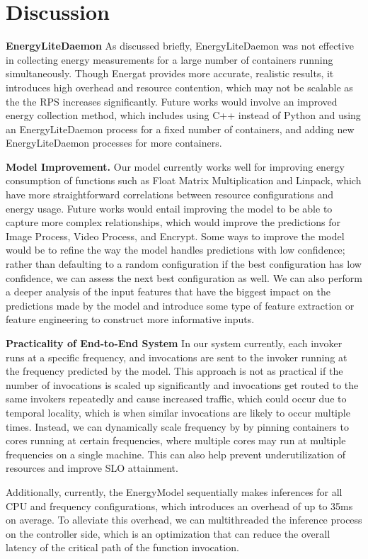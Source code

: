 \documentclass[times, 10pt,twocolumn]{article}
\begin{document}
\section{Discussion}
\textbf{EnergyLiteDaemon} As discussed briefly, EnergyLiteDaemon was not effective in collecting energy measurements for a large number of containers running simultaneously. Though Energat provides more accurate, realistic results, it introduces high overhead and resource contention, which may not be scalable as the the RPS increases significantly. Future works would involve an improved energy collection method, which includes using C++ instead of Python and using an EnergyLiteDaemon process for a fixed number of containers, and adding new EnergyLiteDaemon processes for more containers. 

\textbf{Model Improvement.} Our model currently works well for improving energy consumption of functions such as Float Matrix Multiplication and Linpack, which have more straightforward correlations between resource configurations and energy usage. Future works would entail improving the model to be able to capture more complex relationships, which would improve the predictions for Image Process, Video Process, and Encrypt. Some ways to improve the model would be to refine the way the model handles predictions with low confidence; rather than defaulting to a random configuration if the best configuration has low confidence, we can assess the next best configuration as well. We can also perform a deeper analysis of the input features that have the biggest impact on the predictions made by the model and introduce some type of feature extraction or feature engineering to construct more informative inputs. 

\textbf{Practicality of End-to-End System} In our system currently, each invoker runs at a specific frequency, and invocations are sent to the invoker running at the frequency predicted by the model. This approach is not as practical if the number of invocations is scaled up significantly and invocations get routed to the same invokers repeatedly and cause increased traffic, which could occur due to temporal locality, which is when similar invocations are likely to occur multiple times. Instead, we can dynamically scale frequency by  by pinning containers to cores running at certain frequencies, where multiple cores may run at multiple frequencies on a single machine. This can also help prevent underutilization of resources and improve SLO attainment.

Additionally, currently, the EnergyModel sequentially makes inferences for all CPU and frequency configurations, which introduces an overhead of up to 35ms on average. To alleviate this overhead, we can multithreaded the inference process on the controller side, which is an optimization that can reduce the overall latency of the critical path of the function invocation. 
\end{document}
